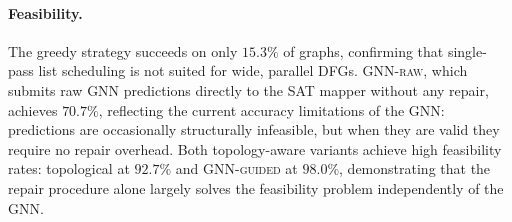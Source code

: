 \documentclass[runningheads]{llncs}
\begin{document}



\paragraph{Feasibility.}
The greedy strategy succeeds on only $15.3\%$ of graphs, confirming that single-pass list scheduling is not suited for wide, parallel DFGs. \textsc{GNN-raw}, which submits raw GNN predictions directly to the SAT mapper without any repair, achieves $70.7\%$, reflecting the current accuracy limitations of the GNN: predictions are occasionally structurally infeasible, but when they are valid they require no repair overhead. Both topology-aware variants achieve high feasibility rates: topological at $92.7\%$ and \textsc{GNN-guided} at $98.0\%$, demonstrating that the repair procedure alone largely solves the feasibility problem independently of the GNN.
\end{document}
